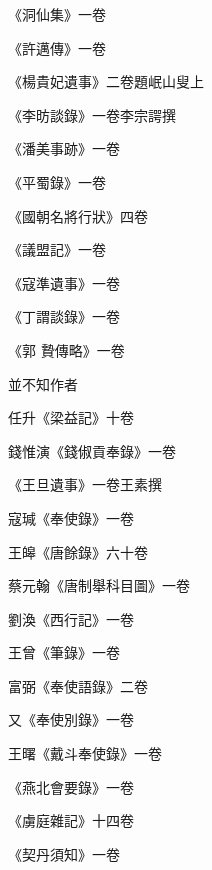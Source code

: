 \begin{pinyinscope}
 《洞仙集》一卷



 《許邁傳》一卷



 《楊貴妃遺事》二卷題岷山叟上



 《李昉談錄》一卷李宗諤撰



 《潘美事跡》一卷



 《平蜀錄》一卷



 《國朝名將行狀》四卷



 《議盟記》一卷



 《寇準遺事》一卷



 《丁謂談錄》一卷



 《郭
 贄傳略》一卷



 並不知作者



 任升《梁益記》十卷



 錢惟演《錢俶貢奉錄》一卷



 《王旦遺事》一卷王素撰



 寇瑊《奉使錄》一卷



 王皞《唐餘錄》六十卷



 蔡元翰《唐制舉科目圖》一卷



 劉渙《西行記》一卷



 王曾《筆錄》一卷



 富弼《奉使語錄》二卷



 又《奉使別錄》一卷



 王曙《戴斗奉使錄》一卷



 《燕北會要錄》一卷



 《虜庭雜記》十四卷



 《契丹須知》一卷




\end{pinyinscope}
